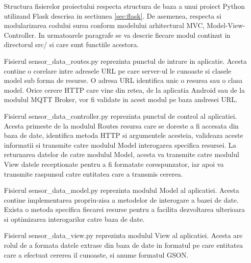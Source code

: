 Structura fisierelor proiectului respecta structura de baza a unui proiect Python utilizand Flask descrisa in sectiunea \ref{sec:flask}. De asemenea, respecta si 
modularizarea codului sursa conform modelului arhitectural MVC, Model-View-Controller. In urmatoarele paragrafe se va descrie fiecare modul continut in directorul 
src/ si care sunt functiile acestora.

Fisierul sensor\_data\_routes.py reprezinta punctul de intrare in aplicatie. Acesta contine o corelare intre adresele URL pe care server-ul le cunoaste si clasele model 
sub forma de resurse. O adresa URL identifica unic o resursa sau o clasa model. Orice cerere HTTP care vine din retea, de la aplicatia Android sau de la modulul MQTT Broker, 
vor fi validate in acest modul pe baza andresei URL.

Fisierul sensor\_data\_controller.py reprezinta punctul de control al aplicatiei. Acesta primeste de la modulul Routes resursa care se doreste a fi accesata din baza de date, 
identifica metoda HTTP si argumentele acesteia, valideaza aceste informatii si transmite catre modulul Model interogarea specifica resursei. La returnarea datelor de catre 
modulul Model, acesta va transmite catre modulul View datele receptionate pentru a fi formatate corespunzator, iar apoi va transmite raspunsul catre entitatea care a transmis 
cererea.

Fisierul sensor\_data\_model.py reprezinta modulul Model al aplicatiei. Acesta contine implementarea propriu-zisa a metodelor de interogare a bazei de date. Exista o metoda 
specifica fiecarei resurse pentru a facilita dezvoltarea ulterioara si optimizarea interogarilor catre baza de date.

Fisierul sensor\_data\_view.py reprezinta modulul View al aplicatiei. Acesta are rolul de a formata datele extrase din baza de date in formatul pe care entitatea care a 
efectuat cererea il cunoaste, si anume formatul GSON. 


